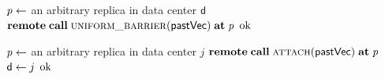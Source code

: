\begin{algorithm*}[t]
\begin{algorithmic}[1]
    \Statex
    \Function{\fence}{\null} \label{line:function-fence}
      \State \var $\mathit{p} \gets$ an arbitrary replica in data center ${\sf d}$
        \label{line:fence-partition}
      \State $\rpc \Call{\uniformbarrier}{\pastVC} \at \p$
        \label{line:fence-call-uniformbarrier}
        \Comment{\tscolor{$\timestamp(\fence) \gets \pastVC$}}
        \label{line:fence-ts}
      \State {}
        \Comment{\lccolor{$\lclock(\fence) \gets \lc$}}
        \label{line:fence-lc}
      \State \Return $\mathrm{ok}$
        \label{line:fence-return}
    \EndFunction

    \Statex
     \label{line:function-migrate}
      \State \var $\mathit{p} \gets$ an arbitrary replica in data center $j$
        \label{line:clattach-partition}
      \State $\rpc \Call{\attach}{\pastVC} \at \p$
        \label{line:clattach-call-attach}
        \Comment{\tscolor{$\timestamp(\clattach) \gets \pastVC$}}
        \label{line:clattach-ts}
      \State {}
        \Comment{\lccolor{$\lclock(\clattach) \gets \lc$}}
        \label{line:clattach-lc}
      \State ${\sf d} \gets j$
        \label{line:clattach-j}
      \State \Return $\mathrm{ok}$
        \label{line:clattach-return}
    \EndFunction
  \end{algorithmic}
\end{algorithm*}